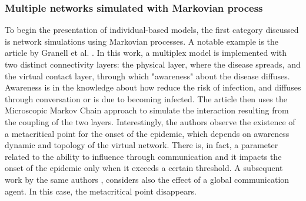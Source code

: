 \subsubsection{Multiple networks simulated with Markovian process}
To begin the presentation of individual-based models, the first category discussed is network simulations using Markovian processes. A notable example is the article by Granell et al. \cite{Granell_2014}. In this work, a multiplex model is implemented with two distinct connectivity layers: the physical layer, where the disease spreads, and the virtual contact layer, through which "awareness" about the disease diffuses. Awareness is in the knowledge about how reduce the risk of infection, and diffuses through conversation or is due to becoming infected. The article then uses the Microscopic Markov Chain approach to simulate the interaction resulting from the coupling of the two layers. Interestingly, the authors observe the existence of a metacritical point for the onset of the epidemic, which depends on awareness dynamic and topology of the virtual network. There is, in fact, a parameter related to the ability to influence through communication and it impacts the onset of the epidemic only when it exceeds a certain threshold.
A subsequent work by the same authors \cite{Granell2013}, considers also the effect of a global communication agent. In this case, the metacritical point disappears.
 
